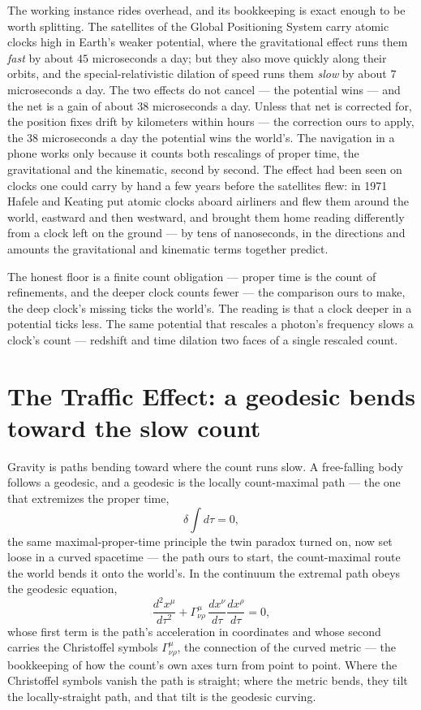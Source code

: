 The working instance rides overhead, and its bookkeeping is exact enough to be worth splitting. The satellites
of the Global Positioning System carry atomic clocks high in Earth's weaker potential, where the gravitational
effect runs them \emph{fast} by about $45$ microseconds a day; but they also move quickly along their orbits,
and the special-relativistic dilation of speed runs them \emph{slow} by about $7$ microseconds a day. The two
effects do not cancel --- the potential wins --- and the net is a gain of about $38$ microseconds a day. Unless
that net is corrected for, the position fixes drift by kilometers within hours --- the correction ours to apply,
the $38$ microseconds a day the potential wins the world's. The navigation in a phone works
only because it counts both rescalings of proper time, the gravitational and the kinematic, second by second.
The effect had been seen on clocks one could carry by hand a few years before the satellites flew: in 1971
Hafele and Keating put atomic clocks aboard airliners and flew them around the world, eastward and then
westward, and brought them home reading differently from a clock left on the ground --- by tens of nanoseconds,
in the directions and amounts the gravitational and kinematic terms together predict.

The honest floor is a finite count obligation --- proper time is the count of refinements, and the deeper clock
counts fewer --- the comparison ours to make, the deep clock's missing ticks the world's. The reading is that a
clock deeper in a potential ticks less. The same potential that rescales a photon's frequency slows a clock's
count --- redshift and time dilation two faces of a single rescaled count.

\section{The Traffic Effect: a geodesic bends toward the slow count}
\label{se:traffic}

Gravity is paths bending toward where the count runs slow. A free-falling body follows a geodesic, and a
geodesic is the locally count-maximal path --- the one that extremizes the proper time,
\begin{equation}
  \delta \int d\tau = 0,
\end{equation}
the same maximal-proper-time principle the twin paradox turned on, now set loose in a curved spacetime --- the
path ours to start, the count-maximal route the world bends it onto the world's. In the
continuum the extremal path obeys the geodesic equation,
\begin{equation}
  \frac{d^2 x^\mu}{d\tau^2} + \Gamma^\mu_{\nu\rho}\,\frac{dx^\nu}{d\tau}\frac{dx^\rho}{d\tau} = 0,
\end{equation}
whose first term is the path's acceleration in coordinates and whose second carries the Christoffel symbols
$\Gamma^\mu_{\nu\rho}$, the connection of the curved metric --- the bookkeeping of how the count's own axes turn
from point to point. Where the Christoffel symbols vanish the path is straight; where the metric bends, they
tilt the locally-straight path, and that tilt is the geodesic curving.

